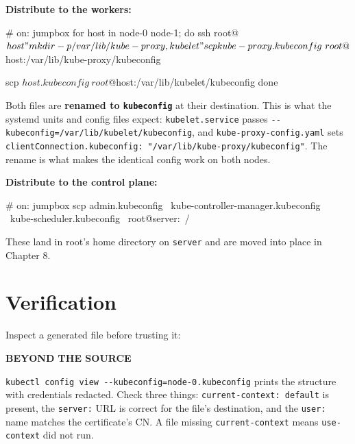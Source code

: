 \documentclass[11pt,oneside]{report}
\newcommand{\calloutlabel}[2]{{\sffamily\bfseries\footnotesize\color{#1}#2\quad}}
\begin{document}
\textbf{Distribute
to the workers:}

\begin{cmdlst}
# on: jumpbox
for host in node-0 node-1; do
  ssh root@${host} "mkdir -p /var/lib/{kube-proxy,kubelet}"

  scp kube-proxy.kubeconfig \
    root@${host}:/var/lib/kube-proxy/kubeconfig \

  scp ${host}.kubeconfig \
    root@${host}:/var/lib/kubelet/kubeconfig
done
\end{cmdlst}

Both files are
\textbf{renamed to
\texttt{kubeconfig}}
at their
destination. This is
what the systemd
units and config
files expect:
\texttt{kubelet.service}
passes
\texttt{-\/-kubeconfig=/}\allowbreak{}\texttt{var/}\allowbreak{}\texttt{lib/}\allowbreak{}\texttt{kubelet/}\allowbreak{}\texttt{kubeconfig},
and
\texttt{kube-}\allowbreak{}\texttt{proxy-}\allowbreak{}\texttt{config.}\allowbreak{}\texttt{yaml}
sets
\texttt{clientConnection.}\allowbreak{}\texttt{kubeconfig:}\allowbreak{}\texttt{\ "/}\allowbreak{}\texttt{var/}\allowbreak{}\texttt{lib/}\allowbreak{}\texttt{kube-}\allowbreak{}\texttt{proxy/}\allowbreak{}\texttt{kubeconfig"}.
The rename is what
makes the identical
config work on both
nodes.

\textbf{Distribute
to the control
plane:}

\begin{cmdlst}
# on: jumpbox
scp admin.kubeconfig \
  kube-controller-manager.kubeconfig \
  kube-scheduler.kubeconfig \
  root@server:~/
\end{cmdlst}

These land in root's
home directory on
\texttt{server} and
are moved into place
in Chapter 8.

\hypertarget{verification-4}{%
\section{Verification}\label{verification-4}}

Inspect a generated
file before trusting
it:

\begin{beyondbox}\calloutlabel{teal}{BEYOND THE SOURCE}

\texttt{kubectl\ config\ view\ -\/-kubeconfig=node-}\allowbreak{}\texttt{0.}\allowbreak{}\texttt{kubeconfig}
prints the structure
with credentials
redacted. Check
three things:
\texttt{current-}\allowbreak{}\texttt{context:}\allowbreak{}\texttt{\ default}
is present, the
\texttt{server:} URL
is correct for the
file's destination,
and the
\texttt{user:} name
matches the
certificate's CN. A
file missing
\texttt{current-context}
means
\texttt{use-context}
did not run.

\end{beyondbox}
\end{document}
